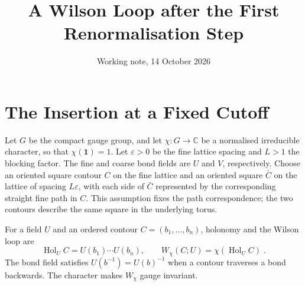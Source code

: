 \documentclass[11pt]{article}
\title{A Wilson Loop after the First Renormalisation Step}
\author{}
\date{Working note, 14 October 2026}
\newcommand{\Hol}{\operatorname{Hol}}
\newcommand{\id}{\mathbf 1}
\begin{document}
\maketitle

\section{The Insertion at a Fixed Cutoff}

Let $G$ be the compact gauge group, and let $\chi \colon G \to \mathbb C$ be a normalised irreducible character, so that $\chi(\id)=1$. Let $\varepsilon>0$ be the fine lattice spacing and $L>1$ the blocking factor. The fine and coarse bond fields are $U$ and $V$, respectively. Choose an oriented square contour $C$ on the fine lattice and an oriented square $\bar C$ on the lattice of spacing $L\varepsilon$, with each side of $\bar C$ represented by the corresponding straight fine path in $C$. This assumption fixes the path correspondence; the two contours describe the same square in the underlying torus.

For a field $U$ and an ordered contour $C=(b_1,\ldots,b_n)$, holonomy and the Wilson loop are
\begin{equation}\label{eq:wilson-definition}
    \Hol_U C=U(b_1)\cdots U(b_n),
    \qquad W_\chi(C;U)=\chi(\Hol_U C)\;.
\end{equation}
The bond field satisfies $U(b^{-1})=U(b)^{-1}$ when a contour traverses a bond backwards. The character makes $W_\chi$ gauge invariant.
\end{document}
